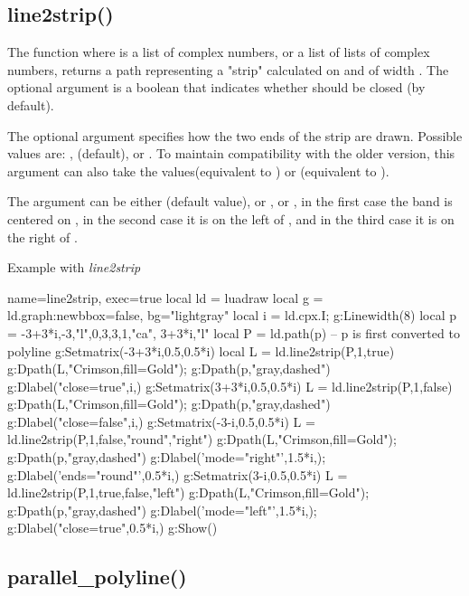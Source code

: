 \subsection{line2strip()}

The function  where  is a list of complex numbers, or a list of lists of complex numbers, returns a path representing a "strip" calculated on  and of width . The optional argument  is a boolean that indicates whether  should be closed (\false by default). 

The optional argument  specifies how the two ends of the strip are drawn. Possible values ​​are: ,  (default), or . To maintain compatibility with the older version, this argument can also take the values ​​\true (equivalent to ) or \false (equivalent to ). 

The argument  can be either  (default value), or , or , in the first case the band is centered on , in the second case it is on the left of , and in the third case it is on the right of .

\begin{demo}{Example with \emph{line2strip}}
\begin{luadraw}{name=line2strip, exec=true}
local ld = luadraw
local g = ld.graph:new{bbox=false, bg="lightgray"}
local i = ld.cpx.I; g:Linewidth(8)
local p = {-3+3*i,-3,"l",0,3,3,1,"ca", 3+3*i,"l"}
local P = ld.path(p)  -- p is first converted to polyline
g:Setmatrix({-3+3*i,0.5,0.5*i})
local L = ld.line2strip(P,1,true)
g:Dpath(L,"Crimson,fill=Gold"); g:Dpath(p,"gray,dashed")
g:Dlabel("close=true",i,{})
g:Setmatrix({3+3*i,0.5,0.5*i})
L = ld.line2strip(P,1,false)
g:Dpath(L,"Crimson,fill=Gold"); g:Dpath(p,"gray,dashed")
g:Dlabel("close=false",i,{})
g:Setmatrix({-3-i,0.5,0.5*i})
L = ld.line2strip(P,1,false,"round","right")
g:Dpath(L,"Crimson,fill=Gold"); g:Dpath(p,"gray,dashed")
g:Dlabel('mode="right"',1.5*i,{}); g:Dlabel('ends="round"',0.5*i,{})
g:Setmatrix({3-i,0.5,0.5*i})
L = ld.line2strip(P,1,true,false,"left")
g:Dpath(L,"Crimson,fill=Gold"); g:Dpath(p,"gray,dashed")
g:Dlabel('mode="left"',1.5*i,{}); g:Dlabel("close=true",0.5*i,{})
g:Show()
\end{luadraw}
\end{demo}

\subsection{parallel\_polyline()}


